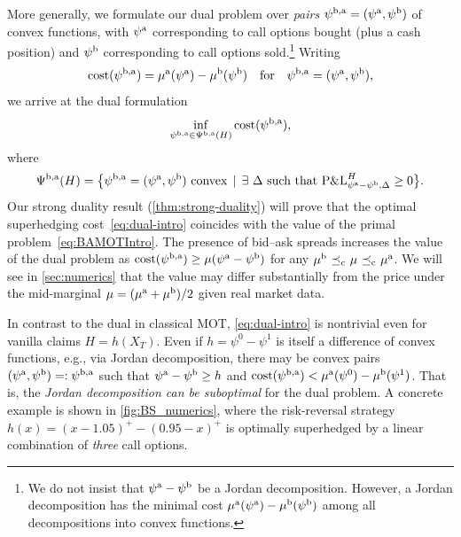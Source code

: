 \documentclass[11pt]{article}
\theoremstyle{plain}
\theoremstyle{definition}
\theoremstyle{remark}
\DeclareMathOperator{\cleq}{\,\preceq_{\rm c}\,}
\theoremstyle{plain}
\begin{document}
More generally, we formulate our dual problem over \emph{pairs} $\psi^{\rm b,a}=(\psi^{\rm a},\psi^{\rm b})$ of convex functions, with $\psi^{\rm a}$ corresponding to call options bought (plus a cash position) and $\psi^{\rm b}$ corresponding to call options sold.\footnote{We do not insist that $\psi^{\rm a}-\psi^{\rm b}$ be a Jordan decomposition. However, a Jordan decomposition has the minimal cost $\mu^{\rm a} (\psi^{\rm a})- \mu^{\rm b} (\psi^{\rm b})$ among all decompositions into convex functions.} %
Writing 
\begin{equation*}%
    \text{cost}(\psi^{\rm b,a}) = \mu^{\rm a} (\psi^{\rm a})- \mu^{\rm b} (\psi^{\rm b}) \quad\text{for}\quad \psi^{\rm b,a}=(\psi^{\rm a},\psi^{\rm b}),
\end{equation*}
we arrive at the dual formulation 
\begin{equation}\label{eq:dual-intro}
    \inf_{\psi^{\rm b,a} \in \Psi^{\rm b,a}(H)}  \text{cost}(\psi^{\rm b,a}), 
\end{equation}
where
$$\Psi^{\rm b,a}(H) = \big\{ \psi^{\rm b,a}=(\psi^{\rm a},\psi^{\rm b}) \text{ convex} \,\mid \, \exists \ {\Delta} \text{ such that } \textnormal{P\&L}_{\psi^{\rm a}-\psi^{\rm b},\Delta}^H\ge 0\big\}.$$
Our strong duality result (\cref{thm:strong-duality}) will prove that the optimal superhedging cost~\eqref{eq:dual-intro} coincides with the value of the primal problem~\eqref{eq:BAMOTIntro}. The presence of bid--ask spreads increases the value of the dual problem as $\text{cost}(\psi^{\rm b,a}) \ge \mu(\psi^{\rm a} - \psi^{\rm b})$ for any $\mu^{\rm b}\cleq \mu \cleq \mu^{\rm a}$. We will see in \cref{sec:numerics} that the value may differ substantially from the price under the mid-marginal $\mu=(\mu^{\rm a}+\mu^{\rm b})/2$ given real market data.

In contrast to the dual in classical MOT, \eqref{eq:dual-intro} is nontrivial even for vanilla claims $H=h(X_T)$. %
Even if $h=\psi^0-\psi^1$ is itself a difference of convex functions, e.g., via %
Jordan decomposition, there may be convex pairs $(\psi^{\rm a},\psi^{\rm b})=:\psi^{\rm b,a}$ such that $\psi^{\rm a}-\psi^{\rm b} \geq h$ and $\text{cost}(\psi^{\rm b,a}) < \mu^{\rm a}(\psi^0) - \mu^{\rm b}(\psi^1)$. That is, the \emph{Jordan decomposition can be suboptimal} for the dual problem. A concrete example is shown in \cref{fig:BS_numerics}, where the risk-reversal strategy $h(x)=(x-1.05)^+-(0.95-x)^+$ is optimally superhedged by a linear combination of \emph{three} call options. 

%
\end{document}
